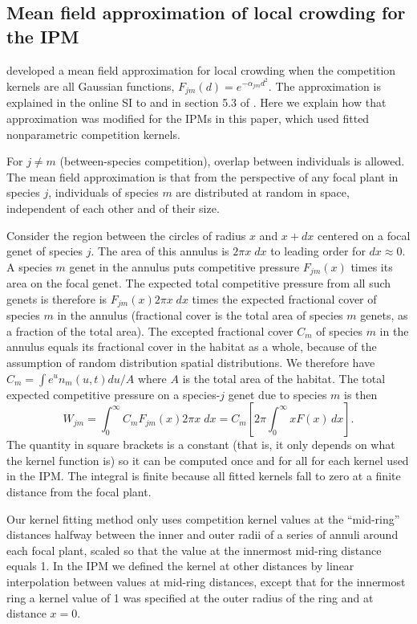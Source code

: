 \documentclass[11pt]{article}
\begin{document}
\subsection{Mean field approximation of local crowding for the IPM} 
\citet{adler_coexistence_2010} developed a mean field approximation for local crowding when the
competition kernels are all Gaussian functions, $F_{jm}(d) = e^{-\alpha_{jm} d^2}$. The approximation is explained in 
the online SI to \citet{adler_coexistence_2010} and in section 5.3 of \citet{Ellner2016}. 
Here we explain how that approximation was modified for the IPMs in this paper, which
used fitted nonparametric competition kernels. 

For $j \ne m$ (between-species competition), overlap between individuals is allowed. The mean field approximation is 
that from the perspective of any focal plant in species $j$, individuals of species $m$ are distributed at random in space, 
independent of each other and of their size.

Consider the region between the circles of radius $x$ and $x+dx$ centered on a focal genet of species $j$. The area of this annulus
is $2 \pi x \; dx$  to leading order for $dx \approx 0$. A species $m$ genet 
in the annulus puts competitive pressure $F_{jm}(x)$ times its area on
the focal genet. The expected total competitive pressure from all such genets 
is therefore is $F_{jm}(x) 2 \pi x \; dx$ times the expected fractional cover of species $m$ in the annulus 
(fractional cover is the total area of species $m$ genets, as a fraction of the total area). The excepted fractional cover $C_m$ of species $m$
in the annulus equals its fractional cover in the habitat as a whole, because of the assumption of random distribution
spatial distributions. We therefore have $C_m  = \int e^u n_m(u,t) du/A$ where $A$ is the total area of the habitat. 
The total expected competitive pressure on a species-$j$ genet due to species $m$ is then 
\begin{equation}
W_{jm} = \int_0^\infty{C_m F_{jm}(x) 2 \pi x \; dx}  = C_m \left [2 \pi \int_0^{\infty} x F(x) \, dx \right ].
\label{eqn:wbarm}
\end{equation} 
The quantity in square brackets is a constant (that is, it only depends on what the kernel function
is) so it can be computed once and for all for each kernel used in the IPM. The integral is finite because
all fitted kernels fall to zero at a finite distance from the focal plant. 

Our kernel fitting method only uses competition kernel values at the ``mid-ring'' distances
halfway between the inner and outer radii of a series of annuli around each focal
plant, scaled so that the value at the innermost mid-ring distance equals 1. 
In the IPM we defined the kernel at other distances by linear interpolation between values at 
mid-ring distances, except that for the innermost ring a kernel value of 1 was specified at the
outer radius of the ring and at distance $x=0$. 
\end{document}

